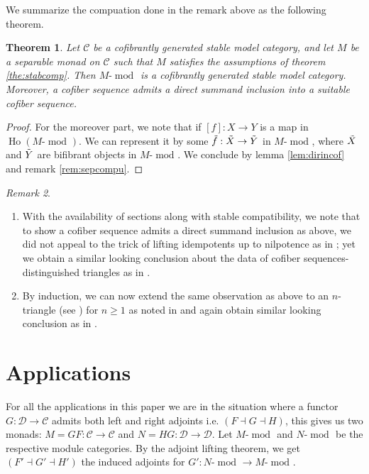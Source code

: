 \documentclass{article}
\newcommand{\cC}{\mathcal{C}}
\newcommand{\cD}{\mathcal{D}}
\newcommand{\module}[2][]{#2\text{-}\modop_{#1}}
\DeclareMathOperator{\Ho}{Ho}
\DeclareMathOperator{\modop}{mod}
\newtheorem{theorem}{Theorem}[section]
\theoremstyle{definition}
\theoremstyle{remark}
\newtheorem{remark}[theorem]{Remark}
\begin{document}
We summarize the compuation done in the remark above as the following theorem.

\begin{theorem} \label{the:mainsepm}
Let $\cC$ be a cofibrantly generated stable model category, and let $M$ be a 
separable monad on $\cC$ such that $M$ satisfies the assumptions of theorem 
\ref{the:stabcomp}. Then $\module{M}$ is a cofibrantly generated stable model 
category. Moreover, a cofiber sequence admits a direct summand inclusion into a suitable
cofiber sequence.
\end{theorem}
\begin{proof} For the moreover part, we note that if $[f]:X  \rightarrow Y$ is a map in $\Ho(\module{M})$. We can represent it by some $\Tilde{f}: \Tilde{X} \rightarrow \Tilde{Y}$ in $\module{M}$, where $\Tilde{X}$ and $\Tilde{Y}$ are bifibrant objects in $\module{M}$. We conclude by lemma \ref{lem:dirincof} and remark \ref{rem:sepcompu}.
\end{proof}
\begin{remark} \label{rem:sepscmnd}
    \begin{enumerate}
        \item With the availability of sections along with stable compatibility, we note that to show a cofiber sequence  admits a direct summand inclusion as above, we did not appeal to the trick of lifting idempotents up to nilpotence as in \cite[lemma 1.6(c)]{balmer:septrcat}; yet we obtain a similar looking conclusion about the data of cofiber sequences-distinguished triangles as in \cite[theorem 4.1]{balmer:septrcat}.
        \item  By induction, we can now extend the same observation as above to an $n$-triangle (see \cite[definition 5.1]{balmer:septrcat}) for $n \ge 1$ as noted in \cite[remark 5.14]{balmer:septrcat} and again obtain similar looking conclusion as in \cite[theroem 5.17]{balmer:septrcat}.
    \end{enumerate}
\end{remark}
\section{Applications} \label{sec:applications}
For all the applications in this paper we are in the situation where a functor $G: \cD \rightarrow \cC$ admits both left and right adjoints i.e. $(F \dashv G \dashv H)$, this gives us two monads: $M=GF \colon \cC \rightarrow \cC$ and  $N=HG \colon \cD \rightarrow \cD$. Let $\module{M}$ and $\module{N}$ be the respective module categories. By the adjoint lifting theorem, we get $(F' \dashv G' \dashv H')$ the induced adjoints for $G': \module{N} \rightarrow \module{M}$. 
\end{document}
